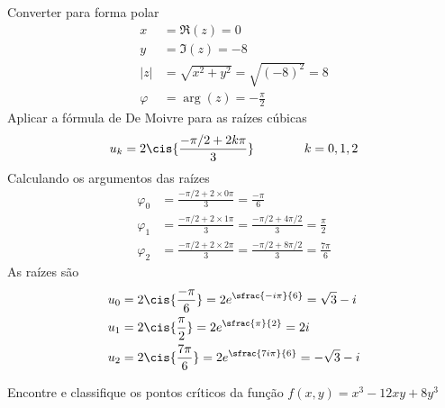 \documentclass[a4paper,12pt,fleqn]{article}
\begin{document}
\begin{answer}
  Converter para forma polar
  \begin{align*}
    x       & = \Re(z) = 0  \\
    y       & = \Im(z) = -8 \\
    |z|     & = \sqrt{x^2+y^2}
              = \sqrt{(-8)^2}
              = 8         \\
    \varphi & = \arg(z) = -\frac{\pi}{2}
  \end{align*}
  Aplicar a fórmula de De Moivre para as raízes cúbicas
  \[
    u_k = 2\cis{\frac{-\pi/2 + 2k\pi}{3}}
  \qquad\qquad k = 0,1,2
  \]
  Calculando os argumentos das raízes
  \begin{align*}
    \varphi_0
    & = \frac{-\pi/2 + 2\times 0\pi}{3}
      = \frac{-\pi}{6} \\
    \varphi_1
    & = \frac{-\pi/2 + 2\times 1\pi}{3}
      = \frac{-\pi/2 + 4\pi/2}{3}
      = \frac{\pi}{2}\\
    \varphi_2
    & = \frac{-\pi/2 + 2\times 2\pi}{3}
      = \frac{-\pi/2 + 8\pi/2}{3}
      = \frac{7\pi}{6}
  \end{align*}
  As raízes são
  \begin{align*}
    u_0 & = 2\cis{\frac{-\pi}{6}} = 2 e^{\sfrac{-i\pi}{6}} =  \sqrt{3} - i \\
    u_1 & = 2\cis{\frac{ \pi}{2}} = 2 e^{\sfrac{  \pi}{2}} = 2i            \\
    u_2 & = 2\cis{\frac{7\pi}{6}} = 2 e^{\sfrac{7i\pi}{6}} = -\sqrt{3} - i
  \end{align*}
\end{answer}

Encontre e classifique os pontos críticos da função
\(
  f(x, y) = x^3 - 12xy + 8y^3
\)
\clearpagequestiononly
\end{document}
